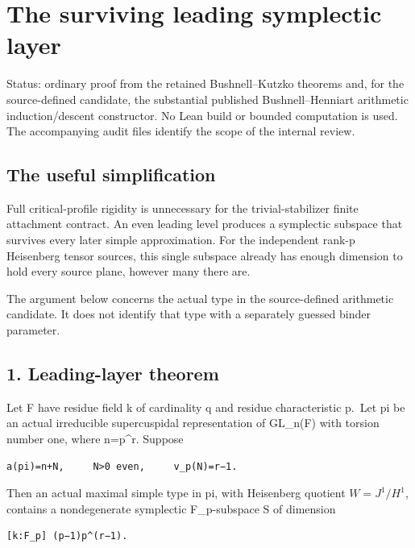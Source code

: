 \clearpage
\section{The surviving leading symplectic layer}\label{app:odd_capacity}

Status: ordinary proof from the retained Bushnell--Kutzko theorems and,
for the source-defined candidate, the substantial published
Bushnell--Henniart arithmetic induction/descent constructor. No Lean
build or bounded computation is used. The accompanying audit files identify the scope of the internal review.

\hypertarget{odd_capacity-the-useful-simplification}{%
\subsection{The useful simplification}\label{odd_capacity-the-useful-simplification}}

Full critical-profile rigidity is unnecessary for the trivial-stabilizer
finite attachment contract. An even leading level produces a symplectic
subspace that survives every later simple approximation. For the
independent rank-p Heisenberg tensor sources, this single subspace
already has enough dimension to hold every source plane, however many
there are.

The argument below concerns the actual type in the source-defined
arithmetic candidate. It does not identify that type with a separately
guessed binder parameter.

\hypertarget{odd_capacity-leading-layer-theorem}{%
\subsection{1. Leading-layer theorem}\label{odd_capacity-leading-layer-theorem}}

Let F have residue field k of cardinality q and residue characteristic
p.~Let pi be an actual irreducible supercuspidal representation of
GL\_n(F) with torsion number one, where n=p\^{}r. Suppose

\begin{Verbatim}[fontsize=\small,breaklines=true,breakanywhere=true]
a(pi)=n+N,     N>0 even,     v_p(N)=r−1.
\end{Verbatim}

Then an actual maximal simple type in pi, with Heisenberg quotient
\(W=J^1/H^1\), contains a nondegenerate symplectic
F\_p-subspace S of dimension

\begin{Verbatim}[fontsize=\small,breaklines=true,breakanywhere=true]
[k:F_p] (p−1)p^(r−1).
\end{Verbatim}


